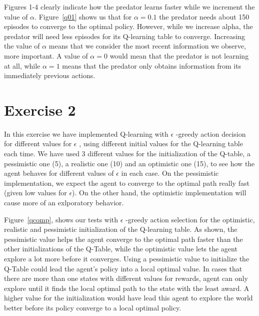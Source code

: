 \documentclass[a4paper,11pt]{article}
\begin{document}
Figures 1-4 clearly indicate how the predator learns faster while we increment the value of $\alpha$. Figure~\ref{q01} shows us that for $\alpha = 0.1$ the predator needs about 150 episodes to converge to the optimal policy. However, while we increase alpha, the predator will need less episodes for its Q-learning table to converge. Increasing the value of $\alpha$ means that we consider the most recent information we observe, more important. A value of $\alpha = 0$ would mean that the predator is not learning at all, while $\alpha = 1$ means that the predator only obtains information from its immediately previous actions. 
 
\section*{Exercise 2}

In this exercise we have implemented Q-learning with $\epsilon$ -greedy action decision for different values for $\epsilon$ , using different initial values for the Q-learning table each time. We have used 3 different values for the initialization of the Q-table, a pessimistic one (5), a realistic one (10) and an optimistic one (15), to see how the agent behaves for different values of $\epsilon$ in each case. On the pessimistic implementation, we expect the agent to converge to the optimal path really fast (given low values for $\epsilon$). On the other hand, the optimistic implementation will cause more of an exlporatory behavior.


Figure~\ref{qcomp}, shows our tests with $\epsilon$ -greedy action selection for the optimistic, realistic and pessimistic initialization of the Q-learning table. As shown, the pessimistic value helps the agent converge to the optimal path faster than the other initializations of the Q-Table, while the optimistic value lets the agent explore a lot more before it converges. Using a pessimistic value to initialize the Q-Table could lead the agent's policy into a local optimal value. In cases that there are more than one states with different values for rewards, agent can only explore until it finds the local optimal path to the state with the least award. A higher value for the initialization would have lead this agent to explore the world better before its policy converge to a local optimal policy. 
\end{document}
